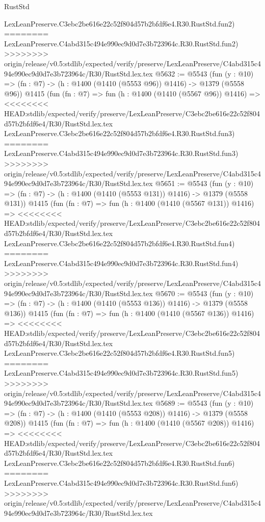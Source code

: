 \begin{lexlean}{RustStd}
\begin{coremodule}
{\begin{coremodule}
{{{{{{{{{{{    LexLeanPreserve.C3ebc2be616e22c52f804d57b2bfdf6e4.R30.RustStd.fun2)
========
    LexLeanPreserve.C4abd315c494e990ec9d0d7e3b723964c.R30.RustStd.fun2)
>>>>>>>> origin/release/v0.5:stdlib/expected/verify/preserve/LexLeanPreserve/C4abd315c494e990ec9d0d7e3b723964c/R30/RustStd.lex.tex
@5632 := @5543
    (fun (y : @10) => (fn : @7) -> (h : @1400 (@1410 (@5553 @96)) @1416) -> @1379 (@5558 @96))
    @1415
    (fun (fn : @7) =>
    fun (h : @1400 (@1410 (@5567 @96)) @1416) =>
<<<<<<<< HEAD:stdlib/expected/verify/preserve/LexLeanPreserve/C3ebc2be616e22c52f804d57b2bfdf6e4/R30/RustStd.lex.tex
    LexLeanPreserve.C3ebc2be616e22c52f804d57b2bfdf6e4.R30.RustStd.fun3)
========
    LexLeanPreserve.C4abd315c494e990ec9d0d7e3b723964c.R30.RustStd.fun3)
>>>>>>>> origin/release/v0.5:stdlib/expected/verify/preserve/LexLeanPreserve/C4abd315c494e990ec9d0d7e3b723964c/R30/RustStd.lex.tex
@5651 := @5543
    (fun (y : @10) => (fn : @7) -> (h : @1400 (@1410 (@5553 @131)) @1416) -> @1379 (@5558 @131))
    @1415
    (fun (fn : @7) =>
    fun (h : @1400 (@1410 (@5567 @131)) @1416) =>
<<<<<<<< HEAD:stdlib/expected/verify/preserve/LexLeanPreserve/C3ebc2be616e22c52f804d57b2bfdf6e4/R30/RustStd.lex.tex
    LexLeanPreserve.C3ebc2be616e22c52f804d57b2bfdf6e4.R30.RustStd.fun4)
========
    LexLeanPreserve.C4abd315c494e990ec9d0d7e3b723964c.R30.RustStd.fun4)
>>>>>>>> origin/release/v0.5:stdlib/expected/verify/preserve/LexLeanPreserve/C4abd315c494e990ec9d0d7e3b723964c/R30/RustStd.lex.tex
@5670 := @5543
    (fun (y : @10) => (fn : @7) -> (h : @1400 (@1410 (@5553 @136)) @1416) -> @1379 (@5558 @136))
    @1415
    (fun (fn : @7) =>
    fun (h : @1400 (@1410 (@5567 @136)) @1416) =>
<<<<<<<< HEAD:stdlib/expected/verify/preserve/LexLeanPreserve/C3ebc2be616e22c52f804d57b2bfdf6e4/R30/RustStd.lex.tex
    LexLeanPreserve.C3ebc2be616e22c52f804d57b2bfdf6e4.R30.RustStd.fun5)
========
    LexLeanPreserve.C4abd315c494e990ec9d0d7e3b723964c.R30.RustStd.fun5)
>>>>>>>> origin/release/v0.5:stdlib/expected/verify/preserve/LexLeanPreserve/C4abd315c494e990ec9d0d7e3b723964c/R30/RustStd.lex.tex
@5689 := @5543
    (fun (y : @10) => (fn : @7) -> (h : @1400 (@1410 (@5553 @208)) @1416) -> @1379 (@5558 @208))
    @1415
    (fun (fn : @7) =>
    fun (h : @1400 (@1410 (@5567 @208)) @1416) =>
<<<<<<<< HEAD:stdlib/expected/verify/preserve/LexLeanPreserve/C3ebc2be616e22c52f804d57b2bfdf6e4/R30/RustStd.lex.tex
    LexLeanPreserve.C3ebc2be616e22c52f804d57b2bfdf6e4.R30.RustStd.fun6)
========
    LexLeanPreserve.C4abd315c494e990ec9d0d7e3b723964c.R30.RustStd.fun6)
>>>>>>>> origin/release/v0.5:stdlib/expected/verify/preserve/LexLeanPreserve/C4abd315c494e990ec9d0d7e3b723964c/R30/RustStd.lex.tex
}}}}}}}}}}}
\end{coremodule}}
\end{coremodule}
\end{lexlean}
